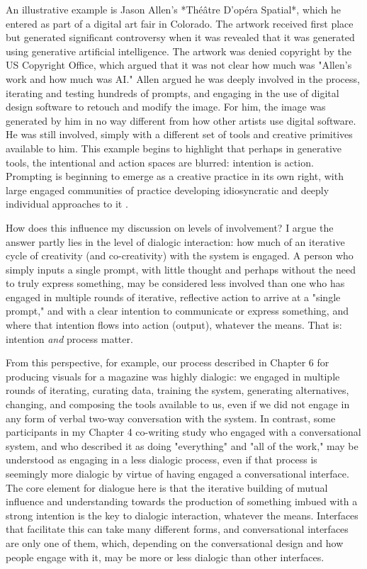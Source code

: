 An illustrative example is Jason Allen's *Théâtre D'opéra Spatial*, which he entered as part of a digital art fair in Colorado. The artwork received first place but generated significant controversy when it was revealed that it was generated using generative artificial intelligence. The artwork was denied copyright by the US Copyright Office, which argued that it was not clear how much was "Allen's work and how much was AI." Allen argued he was deeply involved in the process, iterating and testing hundreds of prompts, and engaging in the use of digital design software to retouch and modify the image. For him, the image was generated by him in no way different from how other artists use digital software. He was still involved, simply with a different set of tools and creative primitives available to him. This example begins to highlight that perhaps in generative tools, the intentional and action spaces are blurred: intention is action. Prompting is beginning to emerge as a creative practice in its own right, with large engaged communities of practice developing idiosyncratic and deeply individual approaches to it \cite{Chang2023-tv}.

How does this influence my discussion on levels of involvement? I argue the answer partly lies in the level of dialogic interaction: how much of an iterative cycle of creativity (and co-creativity) with the system is engaged. A person who simply inputs a single prompt, with little thought and perhaps without the need to truly express something, may be considered less involved than one who has engaged in multiple rounds of iterative, reflective action to arrive at a "single prompt," and with a clear intention to communicate or express something, and where that intention flows into action (output), whatever the means. That is: intention \textit{and} process matter.

From this perspective, for example, our process described in Chapter 6 for producing visuals for a magazine was highly dialogic: we engaged in multiple rounds of iterating, curating data, training the system, generating alternatives, changing, and composing the tools available to us, even if we did not engage in any form of verbal two-way conversation with the system. In contrast, some participants in my Chapter 4 co-writing study who engaged with a conversational system, and who described it as doing "everything" and "all of the work," may be understood as engaging in a less dialogic process, even if that process is seemingly more dialogic by virtue of having engaged a conversational interface. The core element for dialogue here is that the iterative building of mutual influence and understanding towards the production of something imbued with a strong intention is the key to dialogic interaction, whatever the means. Interfaces that facilitate this can take many different forms, and conversational interfaces are only one of them, which, depending on the conversational design and how people engage with it, may be more or less dialogic than other interfaces.



